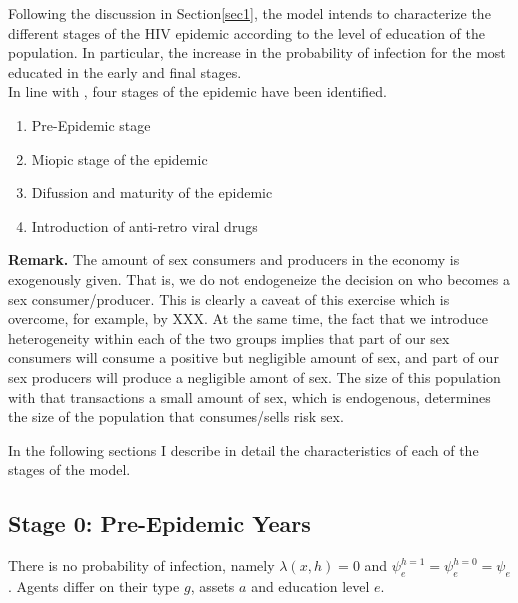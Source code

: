 Following the discussion in Section\ref{sec1}, the model intends to characterize the different stages of the HIV epidemic according to the level of education of the population. In particular, the increase in the probability of infection for the most educated in the early and final stages.\\
In line with \cite{raul}, four stages of the epidemic have been identified. 
\begin{enumerate}
\item Pre-Epidemic stage
\item Miopic stage of the epidemic
\item Difussion and maturity of the epidemic
\item Introduction of anti-retro viral drugs
\end{enumerate}

\noindent \textbf{Remark.} The amount of sex consumers and producers in the economy is exogenously given. That is, we do not endogeneize the decision on who becomes a sex consumer/producer. This is clearly a caveat of this exercise which is overcome, for example, by XXX. At the same time, the fact that we introduce heterogeneity within each of the two groups implies that part of our sex consumers will consume a positive but negligible amount of sex, and part of our sex producers will produce a negligible amont of sex. The size of this population with that transactions a small amount of sex, which is endogenous, determines the size of the population that consumes/sells risk sex.

In the following sections I describe in detail the characteristics of each of the stages of the model.  

\clearpage
\subsection*{\sf Stage 0: Pre-Epidemic Years}\label{sec:stage1}
There is no probability of infection, namely $\lambda(x,h)=0$ and $\psi_{e}^{h=1}=\psi_{e}^{h=0}=\psi_{e}$. Agents differ on their type $g$, assets $a$ and education level $e$.


